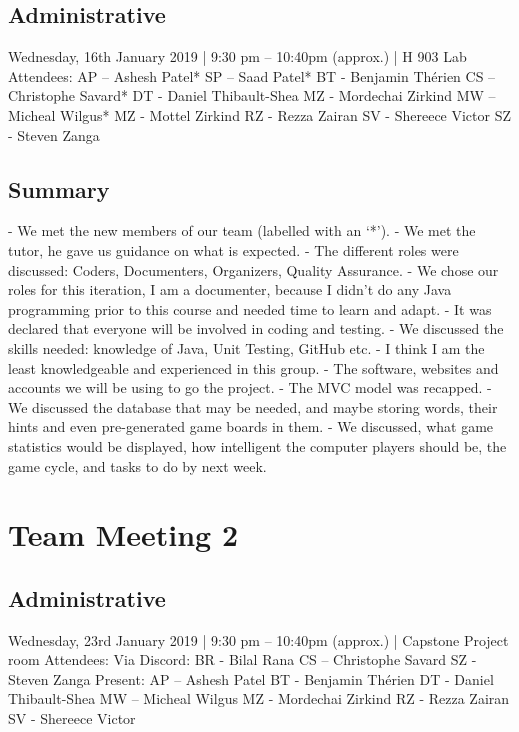 \documentclass[12pt]{article}
\begin{document}
\subsection{Administrative}
Wednesday, 16th January 2019 | 9:30 pm – 10:40pm (approx.) | H 903 Lab 
Attendees: AP – Ashesh Patel*
SP – Saad Patel*
BT - Benjamin Thérien
CS – Christophe Savard* 
DT - Daniel Thibault-Shea
MZ - Mordechai Zirkind 
MW – Micheal Wilgus* 
MZ - Mottel Zirkind
RZ - Rezza Zairan 
SV - Shereece Victor 
SZ - Steven Zanga



\subsection{Summary}
-	We met the new members of our team (labelled with an ‘*’).
-	We met the tutor, he gave us guidance on what is expected.
-	The different roles were discussed: Coders, Documenters, Organizers, Quality Assurance.
-	We chose our roles for this iteration, I am a documenter, because I didn’t do any Java programming prior to this course and needed time to learn and adapt. 
-	It was declared that everyone will be involved in coding and testing. 
-	We discussed the skills needed: knowledge of Java, Unit Testing, GitHub etc.
-	I think I am the least knowledgeable and experienced in this group. 
-	The software, websites and accounts we will be using to go the project. 
-	The MVC model was recapped. 
-	We discussed the database that may be needed, and maybe storing words, their hints and even pre-generated game boards in them. 
-	We discussed, what game statistics would be displayed, how intelligent the computer players should be, the game cycle, and tasks to do by next week. 

 



\pagebreak

\section{Team Meeting 2 }

\subsection{Administrative}
Wednesday, 23rd January 2019 | 9:30 pm – 10:40pm (approx.) | Capstone Project room 
Attendees: 
Via Discord: 
BR - Bilal Rana
CS – Christophe Savard 
SZ - Steven Zanga
Present: 
AP – Ashesh Patel
BT - Benjamin Thérien
DT - Daniel Thibault-Shea
MW – Micheal Wilgus
MZ - Mordechai Zirkind  
RZ - Rezza Zairan 
SV - Shereece Victor 
\end{document}
